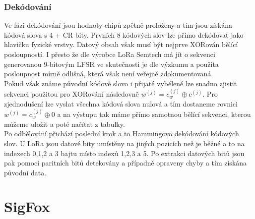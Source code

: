 \documentclass{ctuthesis}
\begin{document}
\subsubsection{Dekódování}
Ve fázi dekódování jsou hodnoty chipů zpětně proloženy a tím jsou získána kódová slova s 4 + CR bity. Prvních 8 kódových slov lze přímo dekódovat jako hlavičku fyzické vrstvy. Datový obsah však musí být nejprve XORován bělící posloupností. I přesto že dle výrobce LoRa Semtech má jít o sekvenci generovanou 9-bitovým LFSR ve skutečnosti je dle výzkumu \cite{gr-lora2016} a \cite{limesdrlora} použita posloupnost mírně odlišná, která však není veřejně zdokumentovaná.\\
Pokud však známe původní kódové slovo i přijaté vybělené lze snadno zjistit sekvenci použitou pro XORování následovně
$w^{(j)} = c_w^{(j)} \oplus c^{(j)}$. Pro zjednodušení lze vyslat všechna kódová slova nulová a tím dostaneme rovnici $w^{(j)} = c_w^{(j)} \oplus 0$ a na výstupu tak máme přímo samotnou bělící sekvenci, kterou můžeme uložit a poté načítat z tabulky. \\
Po odbělování přichází poslední krok a to Hammingovo dekódování kódových slov. U LoRa jsou datové bity umístěny na jiných pozicích než je běžné a to na indexech 0,1,2 a 3 bajtu místo indexů 1,2,3 a 5. Po extrakci datových bitů jsou pak pomocí paritních bitů detekovány a případně opraveny chyby a tím získána původní data.


\section{SigFox}
\end{document}
